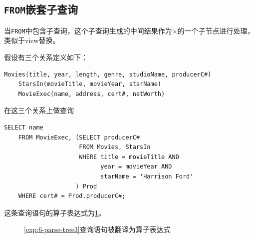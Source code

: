 \subsection{\texttt{FROM}嵌套子查询}

当\texttt{FROM}中包含子查询，这个子查询生成的中间结果作为$\times$的一个子节点进行处理，类似于view替换。

\begin{example}\label{exp:6-parse-tree3}
    假设有三个关系定义如下：
\begin{lstlisting}[style=verbose]
    Movies(title, year, length, genre, studioName, producerC#)
    StarsIn(movieTitle, movieYear, starName)
    MovieExec(name, address, cert#, netWorth)
\end{lstlisting}

    在这三个关系上做查询
\begin{lstlisting}[style=verbose]
    SELECT name
    FROM MovieExec, (SELECT producerC#
                     FROM Movies, StarsIn
                     WHERE title = movieTitle AND
                           year = movieYear AND
                           starName = 'Harrison Ford'
                    ) Prod
    WHERE cert# = Prod.producerC#;
\end{lstlisting}

    这条查询语句的算子表达式为\figurename\ref{fig:6-example3}。
\end{example}

\begin{figure}[H]
    \centering
    \caption{\examplename\ref{exp:6-parse-tree3}查询语句被翻译为算子表达式}\label{fig:6-example3}
\end{figure}

